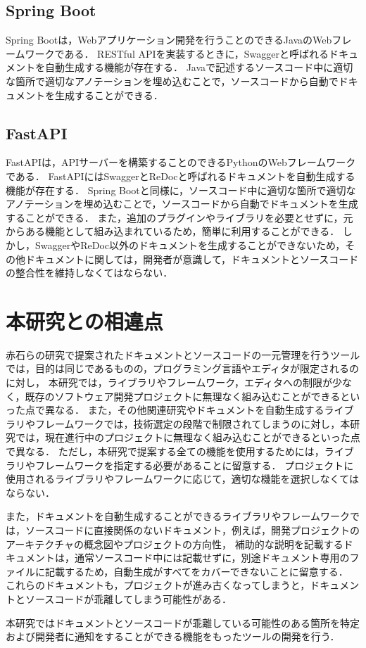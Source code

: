 \subsection{Spring Boot}
Spring Boot\cite{spring}は，Webアプリケーション開発を行うことのできるJavaのWebフレームワークである．
RESTful APIを実装するときに，Swagger\cite{swagger}と呼ばれるドキュメントを自動生成する機能が存在する．
Javaで記述するソースコード中に適切な箇所で適切なアノテーションを埋め込むことで，ソースコードから自動でドキュメントを生成することができる．

\subsection{FastAPI}
FastAPI\cite{fastapi}は，APIサーバーを構築することのできるPythonのWebフレームワークである．
FastAPIにはSwaggerとReDoc\cite{redoc}と呼ばれるドキュメントを自動生成する機能が存在する．
Spring Bootと同様に，ソースコード中に適切な箇所で適切なアノテーションを埋め込むことで，ソースコードから自動でドキュメントを生成することができる．
また，追加のプラグインやライブラリを必要とせずに，元からある機能として組み込まれているため，簡単に利用することができる．
しかし，SwaggerやReDoc以外のドキュメントを生成することができないため，その他ドキュメントに関しては，開発者が意識して，ドキュメントとソースコードの整合性を維持しなくてはならない．

\section{本研究との相違点}
赤石らの研究で提案されたドキュメントとソースコードの一元管理を行うツールでは，目的は同じであるものの，プログラミング言語やエディタが限定されるのに対し，
本研究では，ライブラリやフレームワーク，エディタへの制限が少なく，既存のソフトウェア開発プロジェクトに無理なく組み込むことができるといった点で異なる．
また，その他関連研究やドキュメントを自動生成するライブラリやフレームワークでは，技術選定の段階で制限されてしまうのに対し，本研究では，現在進行中のプロジェクトに無理なく組み込むことができるといった点で異なる．
ただし，本研究で提案する全ての機能を使用するためには，ライブラリやフレームワークを指定する必要があることに留意する．
プロジェクトに使用されるライブラリやフレームワークに応じて，適切な機能を選択しなくてはならない．

また，ドキュメントを自動生成することができるライブラリやフレームワークでは，ソースコードに直接関係のないドキュメント，例えば，開発プロジェクトのアーキテクチャの概念図やプロジェクトの方向性，
補助的な説明を記載するドキュメントは，通常ソースコード中には記載せずに，別途ドキュメント専用のファイルに記載するため，自動生成がすべてをカバーできないことに留意する．
これらのドキュメントも，プロジェクトが進み古くなってしまうと，ドキュメントとソースコードが乖離してしまう可能性がある．

本研究ではドキュメントとソースコードが乖離している可能性のある箇所を特定および開発者に通知をすることができる機能をもったツールの開発を行う．
